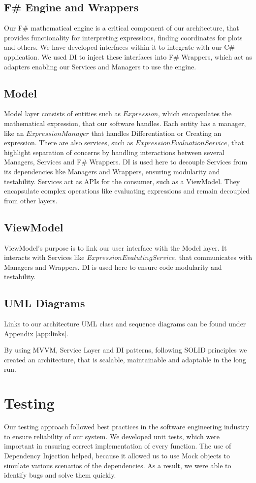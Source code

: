 \documentclass[a4paper, oneside, 11pt]{report}
\begin{document}
\subsection{F\# Engine and Wrappers}
Our F\# mathematical engine is a critical component of our architecture, that provides functionality for interpreting expressions, finding coordinates for plots and others. We have developed interfaces within it to integrate with our C\# application. We used DI to inject these interfaces into F\# Wrappers, which act as adapters enabling our Services and Managers to use the engine.


\subsection{Model}
Model layer consists of entities such as $Expression$, which encapsulates the mathematical expression, that our software handles. Each entity has a manager, like an $ExpressionManager$ that handles Differentiation or Creating an expression. There are also services, such as $ExpressionEvaluationService$, that highlight separation of concerns by handling interactions between several Managers, Services and F\# Wrappers. DI is used here to decouple Services from its dependencies like Managers and Wrappers, ensuring modularity and testability. Services act as APIs for the consumer, such as a ViewModel. They encapsulate complex operations like evaluating expressions and remain decoupled from other layers.

\subsection{ViewModel}
ViewModel's purpose is to link our user interface with the Model layer. It interacts with Services like $ExpressionEvalutingService$, that communicates with Managers and Wrappers. DI is used here to ensure code modularity and testability.

\subsection{UML Diagrams}
Links to our architecture UML class and sequence diagrams can be found under 
Appendix \ref{app:links}.

By using MVVM, Service Layer and DI patterns, following SOLID principles we created an architecture, that is scalable, maintainable and adaptable in the long run.

\section{Testing}
Our testing approach followed best practices in the software engineering industry to ensure reliability of our system. We developed unit tests, which were important in ensuring correct implementation of every function. The use of Dependency Injection helped, because it allowed us to use Mock objects to simulate various scenarios of the dependencies. As a result, we were able to identify bugs and solve them quickly.
\end{document}
